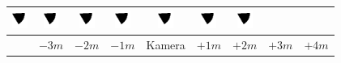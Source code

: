 \begin{tabular}{|c|c|c|c|c|c|c|c|c|}
	\includegraphics[width=0.5cm]{img_Bereich/V2_vid_res_Winkel_Y_-2000_3000.png}&
	\includegraphics[width=0.5cm]{img_Bereich/V2_vid_res_Winkel_Y_-1000_3000.png}&
	\includegraphics[width=0.5cm]{img_Bereich/V2_vid_res_Winkel_Y_0_3000.png}&
	\includegraphics[width=0.5cm]{img_Bereich/V2_vid_res_Winkel_Y_1000_3000.png}&
	\includegraphics[width=0.5cm]{img_Bereich/V2_vid_res_Winkel_Y_2000_3000.png}&
	\includegraphics[width=0.5cm]{img_Bereich/V2_vid_res_Winkel_Y_3000_3000.png}&
	\includegraphics[width=0.5cm]{img_Bereich/V2_vid_res_Winkel_Y_4000_3000.png}\\ 
	\hline 
	& $-3m$ & $-2m$ & $-1m$ &Kamera& $+1m$ & $+2m$ & $+3m$ & $+4m$ \\ 
	\hline 
\end{tabular}{\tiny }